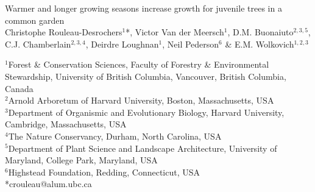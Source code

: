 \documentclass{article}\usepackage[]{graphicx}\usepackage[]{xcolor}
\begin{document}
\linenumbers
{}

\begin{center}
{\sc} {\Large Warmer and longer growing seasons increase growth for juvenile trees in a common garden} \\
\vspace{5ex}
{\sc} Christophe Rouleau-Desrochers$^1$*, Victor Van der Meersch$^1$, D.M. Buonaiuto$^{2,3,5}$, C.J. Chamberlain$^{2,3,4}$, Deirdre Loughnan$^1$, Neil Pederson$^6$ \& E.M. Wolkovich$^{1,2,3}$
\end{center}
$^1$Forest \& Conservation Sciences, Faculty of Forestry \& Environmental Stewardship, University of British Columbia, Vancouver, British Columbia, Canada\\
$^2$Arnold Arboretum of Harvard University, Boston, Massachusetts, USA\\
$^3$Department of Organismic and Evolutionary Biology, Harvard University, Cambridge, Massachusetts, USA\\
$^4$The Nature Conservancy, Durham, North Carolina, USA\\
$^5$Department of Plant Science and Landscape Architecture, University of Maryland, College Park, Maryland, USA \\
$^6$Highstead Foundation, Redding, Connecticut, USA \\
*crouleau@alum.ubc.ca

\newcommand{\Ainc}{\textit{A. incana}}
\newcommand{\Ball}{\textit{B. alleghaniensis}}
\newcommand{\Bpap}{\textit{B. papyrifera}}
\newcommand{\Bpop}{\textit{B. populifolia}}



\end{document}
